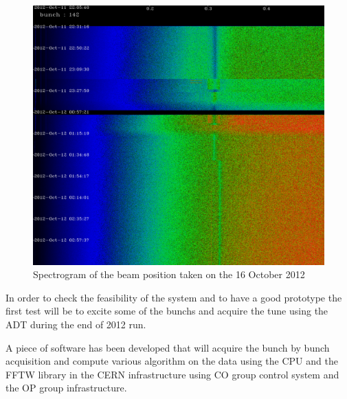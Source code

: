 \begin{figure}[H]
\caption{Spectrogram of the beam position taken on the 16 October 2012}
\centering
\includegraphics[scale=0.2]{spectrogram.pdf}
\end{figure}

In order to check the feasibility of the system and to have a good prototype
the first test will be to excite some of the \glspl{bunch} and acquire the
\gls{tune} using the \gls{ADT} during the end of 2012 run.

A piece of software has been developed that will acquire the bunch by bunch 
acquisition and compute various algorithm on the data using the \gls{CPU} 
and the \gls{FFTW} library in the \gls{CERN} infrastructure using \gls{CO} 
group control system and the \gls{OP} group infrastructure.
